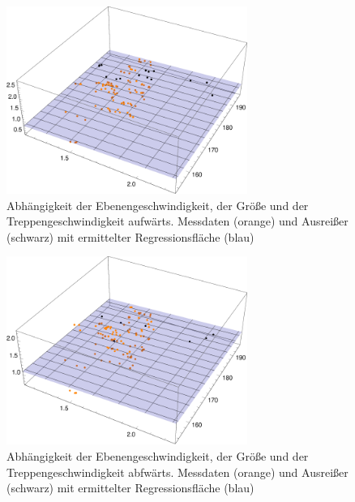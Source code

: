 \begin{figure}[htpb]
	\centering
	\includegraphics[width=0.7\textwidth]{abbildungen/regression/2012_2017_verbund/ohneausreisser/auf-ebene-groesse.pdf}
	
	\caption{Abhängigkeit der Ebenengeschwindigkeit, der Größe und der Treppengeschwindigkeit aufwärts. Messdaten (orange) und Ausreißer (schwarz) mit ermittelter Regressionsfläche (blau)}
	\label{fig:2012_und_2017_OA_auf_ebene_groesse}
\end{figure}



\begin{figure}[htpb]
	\centering
	\includegraphics[width=0.7\textwidth]{abbildungen/regression/2012_2017_verbund/ohneausreisser/ab-ebene-groesse.pdf}
	
	\caption{Abhängigkeit der Ebenengeschwindigkeit, der Größe und der Treppengeschwindigkeit abfwärts. Messdaten (orange) und Ausreißer (schwarz) mit ermittelter Regressionsfläche (blau)}
	\label{fig:2012_und_2017_OA_ab_ebene_groesse}
\end{figure}










